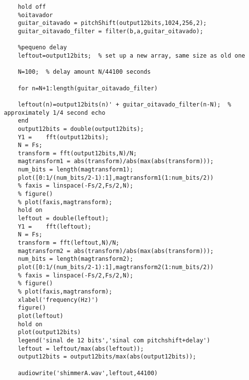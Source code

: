 \begin{lstlisting}
	hold off
	%oitavador
	guitar_oitavado = pitchShift(output12bits,1024,256,2);
	guitar_oitavado_filter = filter(b,a,guitar_oitavado);
	
	%pequeno delay
	leftout=output12bits;  % set up a new array, same size as old one
	
	N=100;  % delay amount N/44100 seconds
	
	for n=N+1:length(guitar_oitavado_filter)
	
	leftout(n)=output12bits(n)' + guitar_oitavado_filter(n-N);  % approximately 1/4 second echo
	end
	output12bits = double(output12bits);
	Y1 =    fft(output12bits);
	N = Fs;
	transform = fft(output12bits,N)/N;
	magtransform1 = abs(transform)/abs(max(abs(transform)));
	num_bits = length(magtransform1);
	plot([0:1/(num_bits/2-1):1],magtransform1(1:num_bits/2))
	% faxis = linspace(-Fs/2,Fs/2,N);
	% figure()
	% plot(faxis,magtransform);
	hold on
	leftout = double(leftout);
	Y1 =    fft(leftout);
	N = Fs;
	transform = fft(leftout,N)/N;
	magtransform2 = abs(transform)/abs(max(abs(transform)));
	num_bits = length(magtransform2);
	plot([0:1/(num_bits/2-1):1],magtransform2(1:num_bits/2))
	% faxis = linspace(-Fs/2,Fs/2,N);
	% figure()
	% plot(faxis,magtransform);
	xlabel('frequency(Hz)')
	figure()
	plot(leftout)
	hold on
	plot(output12bits)
	legend('sinal de 12 bits','sinal com pitchshift+delay')
	leftout = leftout/max(abs(leftout));
	output12bits = output12bits/max(abs(output12bits));
	
	audiowrite('shimmerA.wav',leftout,44100)
\end{lstlisting}

